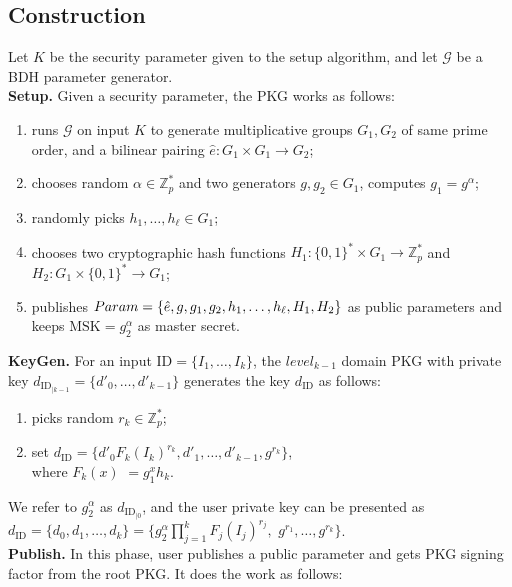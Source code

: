 \documentclass[times]{secauth}
\theoremstyle{definition}
\theoremstyle{remark}
\begin{document}
\subsection{Construction}
Let $K$ be the security parameter given to the setup algorithm, and let $\mathcal{G}$ be a BDH parameter generator.
\\
\textbf{Setup.} Given a security parameter, the PKG works as follows:
\begin{enumerate}
\item runs $\mathcal{G}$ on input $K$ to generate multiplicative groups $G_1, G_2$ of same prime order, and a bilinear pairing $\hat{e}: G_1 \times G_1 \rightarrow G_2$;
\item chooses random $\alpha \in \mathbb{Z}^*_p$ and two generators $g, g_2 \in G_1$, computes $g_1 = g^\alpha$;
\item randomly picks $h_1, \ldots, h_\ell \in G_1$;
\item chooses two cryptographic hash functions $H_1: \{0, 1\}^* \times G_1 \rightarrow \mathbb{Z}_p^*$ and $H_2: G_1 \times \{0, 1\}^* \rightarrow G_1$;
\item publishes $Param = \{\hat{e}, g, g_1,  g_2, h_1, \ldots, h_\ell, H_1, \\H_2\}$ as public parameters and keeps $\mathrm{MSK} = g_2^\alpha$ as master secret.
\end{enumerate}
\textbf{KeyGen.} For an input $\mathrm{ID} = \{I_1, \ldots, I_k\}$, the $level_{k-1}$ domain PKG with private key $d_{\mathrm{ID}_{\mid k-1}} = \{d'_0, \ldots, d'_{k-1}\}$ generates the key $d_\mathrm{ID}$ as follows:
\begin{enumerate}
\item picks random $r_k \in \mathbb{Z}_p^*$;
\item set $d_{\mathrm{ID}} = \{d'_0F_k(I_k)^{r_k}, d'_1, \ldots, d'_{k-1}, g^{r_k}\}$,\\ where $F_k(x)$ $ = g_1^xh_k$.
\end{enumerate}
\par
We refer to $g_2^\alpha$ as $d_{\mathrm{ID}_{\mid 0}}$, and the user private key can be presented as 
$d_{\mathrm{ID}} = \{d_0, d_1, \ldots, d_k\} = \{g_2^\alpha \prod^k_{j=1} F_j(I_j)^{r_j},$ $g^{r_1}, \ldots, g^{r_k}\}$.
\vspace{0.2cm}
\\
\textbf{Publish.} In this phase, user publishes a public parameter and gets PKG signing factor from the root PKG. It does the work as follows:
\end{document}
